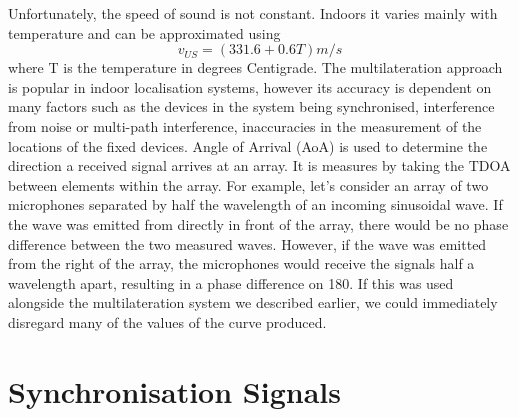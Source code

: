 \documentclass[]{final_report}
\begin{document}
Unfortunately, the speed of sound is not constant. Indoors it varies mainly with temperature and can be approximated using \[ v_{US}  = (331.6 + 0.6T)m/s \] where T is the temperature in degrees Centigrade. 
The multilateration approach is popular in indoor localisation systems, however its accuracy is dependent on many factors such as the devices in the system being synchronised, interference from noise or multi-path interference, inaccuracies in the measurement of the locations of the fixed devices.
Angle of Arrival (AoA) is used to determine the direction a received signal arrives at an array. It is measures by taking the TDOA between elements within the array. For example, let’s consider an array of two microphones separated by half the wavelength of an incoming sinusoidal wave. If the wave was emitted from directly in front of the array, there would be no phase difference between the two measured waves. However, if the wave was emitted from the right of the array, the microphones would receive the signals half a wavelength apart, resulting in a phase difference on 180. If this was used alongside the multilateration system we described earlier, we could immediately disregard many of the values of the curve produced. 

\section{Synchronisation Signals}
\end{document}
